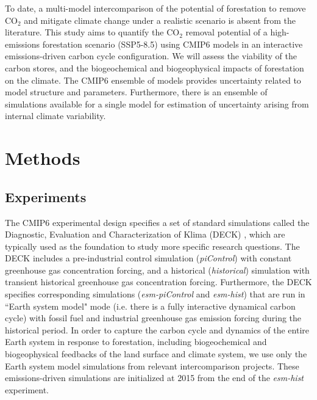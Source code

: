 \documentclass[]{article}
\begin{document}
To date, a multi-model intercomparison of the potential of forestation to remove CO$_2$ and mitigate climate change under a realistic scenario is absent from the literature.
This study aims to quantify the CO$_2$ removal potential of a high-emissions forestation scenario (SSP5-8.5) using CMIP6 models in an interactive emissions-driven carbon cycle configuration.
We will assess the viability of the carbon stores, and the biogeochemical and biogeophysical impacts of forestation on the climate.
The CMIP6 ensemble of models provides uncertainty related to model structure and parameters.
Furthermore, there is an ensemble of simulations available for a single model for estimation of uncertainty arising from internal climate variability. 

\section{Methods}

\subsection{Experiments}

The CMIP6 experimental design specifies a set of standard simulations called the Diagnostic, Evaluation and Characterization of Klima (DECK) \parencite{eyring_overview_2016}, which are typically used as the foundation to study more specific research questions.
The DECK includes a pre-industrial control simulation (\textit{piControl}) with constant greenhouse gas concentration forcing, and a historical (\textit{historical}) simulation with transient historical greenhouse gas concentration forcing.
Furthermore, the DECK specifies corresponding simulations (\textit{esm-piControl} and \textit{esm-hist}) that are run in ``Earth system model" mode (i.e. there is a fully interactive dynamical carbon cycle) with fossil fuel and industrial greenhouse gas emission forcing during the historical period.
In order to capture the carbon cycle and dynamics of the entire Earth system in response to forestation, including biogeochemical and biogeophysical feedbacks of the land surface and climate system, we use only the Earth system model simulations from relevant intercomparison projects. These emissions-driven simulations are initialized at 2015 from the end of the \textit{esm-hist} experiment.
\end{document}

